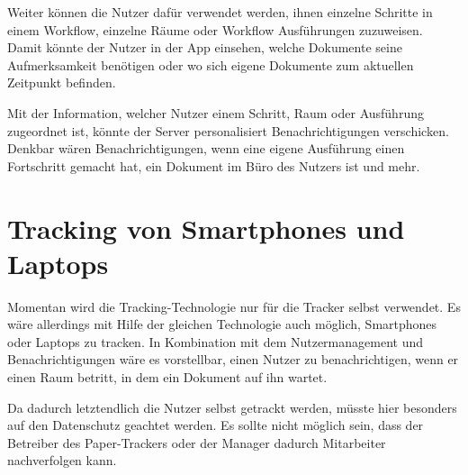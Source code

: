 Weiter können die Nutzer dafür verwendet werden, ihnen einzelne Schritte in einem Workflow, einzelne Räume
oder Workflow Ausführungen zuzuweisen.
Damit könnte der Nutzer in der App einsehen, welche Dokumente seine Aufmerksamkeit benötigen oder wo sich eigene Dokumente
zum aktuellen Zeitpunkt befinden.

Mit der Information, welcher Nutzer einem Schritt, Raum oder Ausführung zugeordnet ist, könnte der Server personalisiert
Benachrichtigungen verschicken.
Denkbar wären Benachrichtigungen, wenn eine eigene Ausführung einen Fortschritt gemacht hat, ein Dokument im Büro
des Nutzers ist und mehr.

\section{Tracking von Smartphones und Laptops}

Momentan wird die Tracking-Technologie nur für die Tracker selbst verwendet.
Es wäre allerdings mit Hilfe der gleichen Technologie auch möglich, Smartphones oder Laptops zu tracken.
In Kombination mit dem Nutzermanagement und Benachrichtigungen wäre es vorstellbar, einen Nutzer zu benachrichtigen,
wenn er einen Raum betritt, in dem ein Dokument auf ihn wartet.

Da dadurch letztendlich die Nutzer selbst getrackt werden, müsste hier besonders auf den Datenschutz geachtet werden.
Es sollte nicht möglich sein, dass der Betreiber des Paper-Trackers oder der Manager dadurch Mitarbeiter nachverfolgen kann.
